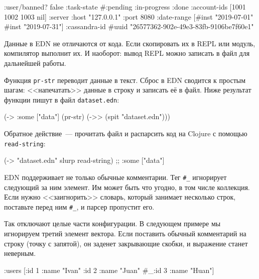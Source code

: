 \begin{english}
  \begin{clojure}
{:user/banned? false
 :task-state #{:pending :in-progress :done}
 :account-ids [1001 1002 1003 nil]
 :server {:host "127.0.0.1" :port 8080}
 :date-range [#inst "2019-07-01" #inst "2019-07-31"]
 :cassandra-id #uuid "26577362-902e-49e3-83fb-9106be7f60e1"}
  \end{clojure}
\end{english}

Данные в EDN не отличаются от кода. Если скопировать их в REPL или модуль,
компилятор выполнит их. И наоборот: вывод REPL можно записать в файл для
дальнейшей работы.

Функция \verb|pr-str| переводит данные в текст. Сброс в EDN сводится к простым
шагам: <<напечатать>> данные в строку и записать её в файл. Ниже результат
функции пишут в файл \verb|dataset.edn|:

\begin{english}
  \begin{clojure}
(-> {:some ["data"]}
    (pr-str)
    (->> (spit "dataset.edn")))
  \end{clojure}
\end{english}

Обратное действие~--- прочитать файл и распарсить код на Clojure с помощью
\verb|read-string|:

\begin{english}
  \begin{clojure}
(-> "dataset.edn" slurp read-string)
;; {:some ["data"]}
  \end{clojure}
\end{english}


EDN поддерживает не только обычные комментарии. Тег \verb|#_| игнорирует
следующий за ним элемент. Им может быть что угодно, в том числе коллекция. Если
нужно <<заигнорить>> словарь, который занимает несколько строк, поставьте перед
ним \verb|#_|, и парсер пропустит его.


Так отключают целые части конфигурации. В следующем примере мы игнорируем третий
элемент вектора. Если поставить обычный комментарий на строку (точку с запятой),
он заденет закрывающие скобки, и выражение станет неверным.

\begin{english}
  \begin{clojure}
{:users [{:id 1 :name "Ivan"}
         {:id 2 :name "Juan"}
         #_{:id 3 :name "Huan"}]}
  \end{clojure}
\end{english}

